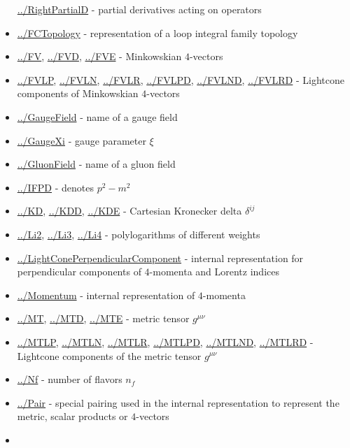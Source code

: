 \documentclass[../FeynCalcManual.tex]{subfiles}
\begin{document}
\begin{itemize}
  \hyperlink{../rightpartiald}{../RightPartialD} - partial derivatives
  acting on operators
\item
  \hyperlink{../fctopology}{../FCTopology} - representation of a loop
  integral family topology
\item
  \hyperlink{../fv}{../FV}, \hyperlink{../fvd}{../FVD},
  \hyperlink{../fve}{../FVE} - Minkowskian \(4\)-vectors
\item
  \hyperlink{../fvlp}{../FVLP}, \hyperlink{../fvln}{../FVLN},
  \hyperlink{../fvlr}{../FVLR}, \hyperlink{../fvlpd}{../FVLPD},
  \hyperlink{../fvlnd}{../FVLND}, \hyperlink{../fvlrd}{../FVLRD} -
  Lightcone components of Minkowskian \(4\)-vectors
\item
  \hyperlink{../gaugefield}{../GaugeField} - name of a gauge field
\item
  \hyperlink{../gaugexi}{../GaugeXi} - gauge parameter \(\xi\)
\item
  \hyperlink{../gluonfield}{../GluonField} - name of a gluon field
\item
  \hyperlink{../ifpd}{../IFPD} - denotes \(p^2 - m^2\)
\item
  \hyperlink{../kd}{../KD}, \hyperlink{../kdd}{../KDD},
  \hyperlink{../kde}{../KDE} - Cartesian Kronecker delta \(\delta^{ij}\)
\item
  \hyperlink{../li2}{../Li2}, \hyperlink{../li3}{../Li3},
  \hyperlink{../li4}{../Li4} - polylogarithms of different weights
\item
  \hyperlink{../lightconeperpendicularcomponent}{../LightConePerpendicularComponent}
  - internal representation for perpendicular components of
  \(4\)-momenta and Lorentz indices
\item
  \hyperlink{../momentum}{../Momentum} - internal representation of
  \(4\)-momenta
\item
  \hyperlink{../mt}{../MT}, \hyperlink{../mtd}{../MTD},
  \hyperlink{../mte}{../MTE} - metric tensor \(g^{\mu \nu}\)
\item
  \hyperlink{../mtlp}{../MTLP}, \hyperlink{../mtln}{../MTLN},
  \hyperlink{../mtlr}{../MTLR}, \hyperlink{../mtlpd}{../MTLPD},
  \hyperlink{../mtlnd}{../MTLND}, \hyperlink{../mtlrd}{../MTLRD} -
  Lightcone components of the metric tensor \(g^{\mu \nu}\)
\item
  \hyperlink{../nf}{../Nf} - number of flavors \(n_f\)
\item
  \hyperlink{../pair}{../Pair} - special pairing used in the internal
  representation to represent the metric, scalar products or
  \(4\)-vectors
\item

\end{itemize}
\end{document}
